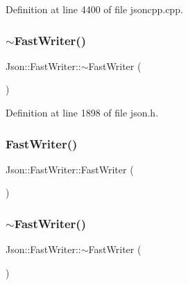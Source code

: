 Definition at line 4400 of file jsoncpp.\+cpp.

\hypertarget{class_json_1_1_fast_writer_a34152eac509fe00c9b2e15ce2fc94ab8}{}\label{class_json_1_1_fast_writer_a34152eac509fe00c9b2e15ce2fc94ab8} 
\subsubsection{\texorpdfstring{$\sim$\+Fast\+Writer()}{~FastWriter()}\hspace{0.1cm}{\footnotesize\ttfamily [1/2]}}
{\footnotesize\ttfamily Json\+::\+Fast\+Writer\+::$\sim$\+Fast\+Writer (\begin{DoxyParamCaption}{ }\end{DoxyParamCaption})\hspace{0.3cm}{\ttfamily [inline]}}



Definition at line 1898 of file json.\+h.

\hypertarget{class_json_1_1_fast_writer_a1bbc73ce1a1cc7b09cd1e02db3905170}{}\label{class_json_1_1_fast_writer_a1bbc73ce1a1cc7b09cd1e02db3905170} 
\subsubsection{\texorpdfstring{Fast\+Writer()}{FastWriter()}\hspace{0.1cm}{\footnotesize\ttfamily [2/2]}}
{\footnotesize\ttfamily Json\+::\+Fast\+Writer\+::\+Fast\+Writer (\begin{DoxyParamCaption}{ }\end{DoxyParamCaption})}

\hypertarget{class_json_1_1_fast_writer_a34152eac509fe00c9b2e15ce2fc94ab8}{}\label{class_json_1_1_fast_writer_a34152eac509fe00c9b2e15ce2fc94ab8} 
\subsubsection{\texorpdfstring{$\sim$\+Fast\+Writer()}{~FastWriter()}\hspace{0.1cm}{\footnotesize\ttfamily [2/2]}}
{\footnotesize\ttfamily Json\+::\+Fast\+Writer\+::$\sim$\+Fast\+Writer (\begin{DoxyParamCaption}{ }\end{DoxyParamCaption})\hspace{0.3cm}{\ttfamily [inline]}}



